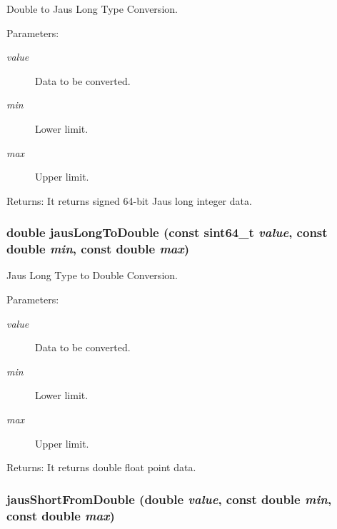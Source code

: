 Double to Jaus Long Type Conversion. 

\begin{Desc}
\item[Parameters:]
\begin{description}
\item[{\em value}]Data to be converted. \item[{\em min}]Lower limit. \item[{\em max}]Upper limit.\end{description}
\end{Desc}
\begin{Desc}
\item[Returns:]It returns signed 64-bit Jaus long integer data. \end{Desc}
\hypertarget{group__data__conv_g800a7c2530f63a5e6bc279ff80b58053}{
\subsubsection[jausLongToDouble]{\setlength{\rightskip}{0pt plus 5cm}double jausLongToDouble (const {\bf sint64\_\-t} {\em value}, \/  const double {\em min}, \/  const double {\em max})}}
\label{group__data__conv_g800a7c2530f63a5e6bc279ff80b58053}


Jaus Long Type to Double Conversion. 

\begin{Desc}
\item[Parameters:]
\begin{description}
\item[{\em value}]Data to be converted. \item[{\em min}]Lower limit. \item[{\em max}]Upper limit.\end{description}
\end{Desc}
\begin{Desc}
\item[Returns:]It returns double float point data. \end{Desc}
\hypertarget{group__data__conv_g64a0bea692fa765ff51fc8a897961b6c}{
\subsubsection[jausShortFromDouble]{ jausShortFromDouble (double {\em value}, \/  const double {\em min}, \/  const double {\em max})}}
\label{group__data__conv_g64a0bea692fa765ff51fc8a897961b6c}


